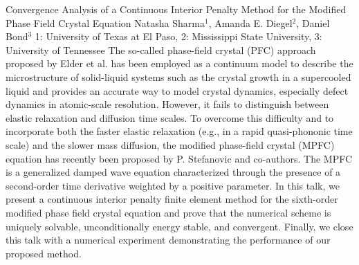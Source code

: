 \vspace{1.5ex}
\abs
{Convergence Analysis of a Continuous Interior Penalty Method for the Modified Phase Field Crystal Equation}
{Natasha Sharma$^{1}$, Amanda E. Diegel$^{2}$, Daniel Bond$^{3}$}
{1: University of Texas at El Paso, 2: Mississippi State University, 3: University of Tennessee}
{The so-called phase-field crystal (PFC) approach proposed by Elder et al. has been employed as a continuum model to describe the microstructure of solid-liquid systems such as the crystal growth in a supercooled liquid and provides an accurate way to model crystal dynamics, especially defect dynamics in atomic-scale resolution. However, it fails to distinguish between elastic relaxation and diffusion time scales. To overcome this difficulty and to incorporate both the faster elastic relaxation (e.g., in a rapid quasi-phononic time scale) and the slower mass diffusion, the modified phase-field crystal (MPFC) equation has recently been proposed by P. Stefanovic and co-authors. The MPFC is a generalized damped wave equation characterized through the presence of a second-order time derivative weighted by a positive parameter. In this talk, we present a continuous interior penalty finite element method for the sixth-order modified phase field crystal equation and  prove that the numerical scheme is uniquely solvable, unconditionally energy stable, and convergent. Finally, we close this talk with a numerical experiment demonstrating the performance of our proposed method.}


